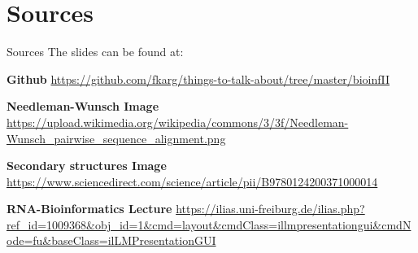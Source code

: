 
\section{Sources}

\begin{frame}{Sources}
    The slides can be found at: \newline \newline

    \beamertemplatearticlebibitems
    \begin{thebibliography}{10}

        {\bf Github}
        \newblock \url{https://github.com/fkarg/things-to-talk-about/tree/master/bioinfII}
    \newline

            {\bf Needleman-Wunsch Image}
            \newblock \url{https://upload.wikimedia.org/wikipedia/commons/3/3f/Needleman-Wunsch_pairwise_sequence_alignment.png}

            {\bf Secondary structures Image}
            \newblock \url{https://www.sciencedirect.com/science/article/pii/B9780124200371000014}

            {\bf RNA-Bioinformatics Lecture}
            \newblock \url{https://ilias.uni-freiburg.de/ilias.php?ref_id=1009368&obj\_id=1&cmd=layout&cmdClass=illmpresentationgui&cmdNode=fu&baseClass=ilLMPresentationGUI}



\end{thebibliography}
\end{frame}
